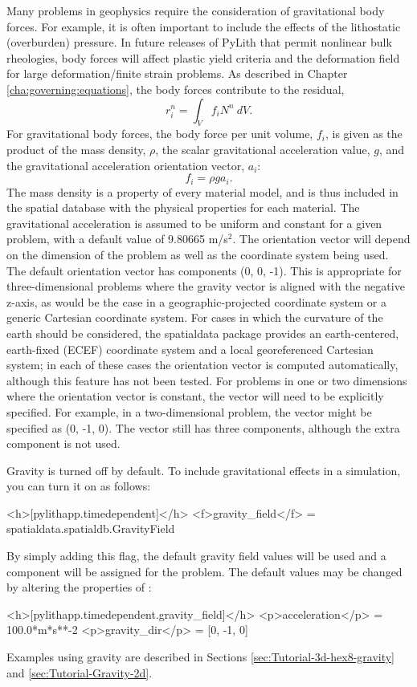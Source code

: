 Many problems in geophysics require the consideration of gravitational
body forces. For example, it is often important to include the effects
of the lithostatic (overburden) pressure. In future releases of PyLith
that permit nonlinear bulk rheologies, body forces will affect plastic
yield criteria and the deformation field for large deformation/finite
strain problems. As described in Chapter \vref{cha:governing:equations},
the body forces contribute to the residual,
\begin{equation}
r_{i}^{n}=\int_{V}f_{i}N^{n}\: dV.
\end{equation}
For gravitational body forces, the body force per unit volume, $f_{i}$,
is given as the product of the mass density, $\rho$, the scalar gravitational
acceleration value, $g$, and the gravitational acceleration orientation
vector, $a_{i}$:
\begin{equation}
f_{i}=\rho ga_{i}.
\end{equation}
The mass density is a property of every material model, and is thus
included in the spatial database with the physical properties for
each material. The gravitational acceleration is assumed to be uniform
and constant for a given problem, with a default value of 9.80665
m/s$^{\text{2}}$. The orientation vector will depend on the dimension
of the problem as well as the coordinate system being used. The default
orientation vector has components (0, 0, -1). This is appropriate
for three-dimensional problems where the gravity vector is aligned
with the negative z-axis, as would be the case in a geographic-projected
coordinate system or a generic Cartesian coordinate system. For cases
in which the curvature of the earth should be considered, the spatialdata
package provides an earth-centered, earth-fixed (ECEF) coordinate
system and a local georeferenced Cartesian system; in each of these
cases the orientation vector is computed automatically, although this
feature has not been tested. For problems in one or two dimensions
where the orientation vector is constant, the vector will need to
be explicitly specified. For example, in a two-dimensional problem,
the vector might be specified as (0, -1, 0). The vector still has
three components, although the extra component is not used.

Gravity is turned off by default. To include gravitational effects
in a simulation, you can turn it on as follows:
\begin{cfg}
<h>[pylithapp.timedependent]</h>
<f>gravity_field</f> = spatialdata.spatialdb.GravityField
\end{cfg}
By simply adding this flag, the default gravity field values will
be used and a  component will be assigned for
the problem. The default values may be changed by altering the properties
of :
\begin{cfg}
<h>[pylithapp.timedependent.gravity_field]</h>
<p>acceleration</p> = 100.0*m*s**-2
<p>gravity_dir</p> = [0, -1, 0]
\end{cfg}
Examples using gravity are described in Sections \vref{sec:Tutorial-3d-hex8-gravity}
and \vref{sec:Tutorial-Gravity-2d}.

